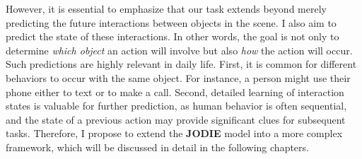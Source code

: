 However, it is essential to emphasize that our task extends beyond merely predicting the future interactions between objects in the scene. I also aim to predict the state of these interactions. In other words, the goal is not only to determine \textit{which object} an action will involve but also \textit{how} the action will occur. Such predictions are highly relevant in daily life. First, it is common for different behaviors to occur with the same object. For instance, a person might use their phone either to text or to make a call. Second, detailed learning of interaction states is valuable for further prediction, as human behavior is often sequential, and the state of a previous action may provide significant clues for subsequent tasks. Therefore, I propose to extend the \textbf{JODIE} model into a more complex framework, which will be discussed in detail in the following chapters.